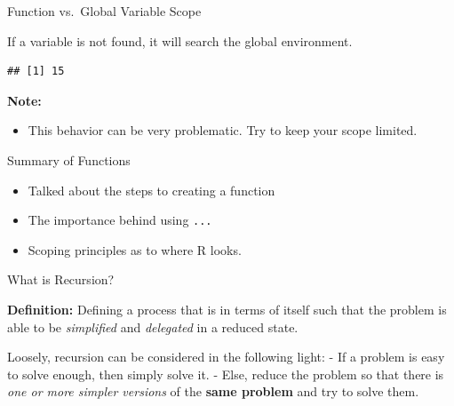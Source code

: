 \begin{frame}[fragile]{Function vs.~Global Variable Scope}

If a variable is not found, it will search the global environment.

\begin{Shaded}
\begin{Highlighting}[]
\StringTok{ }

\StringTok{ }
  \StringTok{ }
\NormalTok{\}}

\NormalTok{(}\NormalTok{)}
\end{Highlighting}
\end{Shaded}

\begin{verbatim}
## [1] 15
\end{verbatim}

\textbf{Note:}

\begin{itemize}
\tightlist
\item
  This behavior can be very problematic. Try to keep your scope limited.
\end{itemize}

\end{frame}

\begin{frame}[fragile]{Summary of Functions}

\begin{itemize}
\tightlist
\item
  Talked about the steps to creating a function
\item
  The importance behind using \texttt{...}
\item
  Scoping principles as to where R looks.
\end{itemize}

\end{frame}

\begin{frame}{What is Recursion?}

\textbf{Definition:} Defining a process that is in terms of itself such
that the problem is able to be \emph{simplified} and \emph{delegated} in
a reduced state.

Loosely, recursion can be considered in the following light: - If a
problem is easy to solve enough, then simply solve it. - Else, reduce
the problem so that there is \emph{one or more simpler versions} of the
\textbf{same problem} and try to solve them.

\end{frame}

